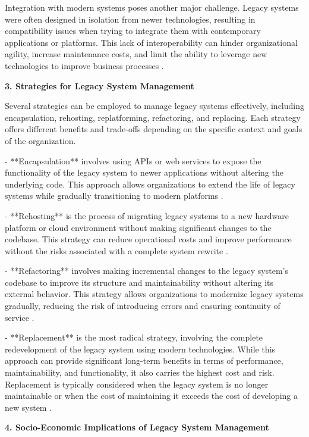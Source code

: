 \begin{refsection}
Integration with modern systems poses another major challenge. Legacy systems were often designed in isolation from newer technologies, resulting in compatibility issues when trying to integrate them with contemporary applications or platforms. This lack of interoperability can hinder organizational agility, increase maintenance costs, and limit the ability to leverage new technologies to improve business processes \cite[pp.~234-236]{bennett2002software}.

\textbf{3. Strategies for Legacy System Management}

Several strategies can be employed to manage legacy systems effectively, including encapsulation, rehosting, replatforming, refactoring, and replacing. Each strategy offers different benefits and trade-offs depending on the specific context and goals of the organization.

- **Encapsulation** involves using APIs or web services to expose the functionality of the legacy system to newer applications without altering the underlying code. This approach allows organizations to extend the life of legacy systems while gradually transitioning to modern platforms \cite[pp.~131-133]{bennett2002software}.

- **Rehosting** is the process of migrating legacy systems to a new hardware platform or cloud environment without making significant changes to the codebase. This strategy can reduce operational costs and improve performance without the risks associated with a complete system rewrite \cite[pp.~201-202]{brodie2001legacy}.

- **Refactoring** involves making incremental changes to the legacy system's codebase to improve its structure and maintainability without altering its external behavior. This strategy allows organizations to modernize legacy systems gradually, reducing the risk of introducing errors and ensuring continuity of service \cite[pp.~109-111]{parnas1994software}.

- **Replacement** is the most radical strategy, involving the complete redevelopment of the legacy system using modern technologies. While this approach can provide significant long-term benefits in terms of performance, maintainability, and functionality, it also carries the highest cost and risk. Replacement is typically considered when the legacy system is no longer maintainable or when the cost of maintaining it exceeds the cost of developing a new system \cite[pp.~214-216]{bennett2002software}.

\textbf{4. Socio-Economic Implications of Legacy System Management}


\end{refsection}
